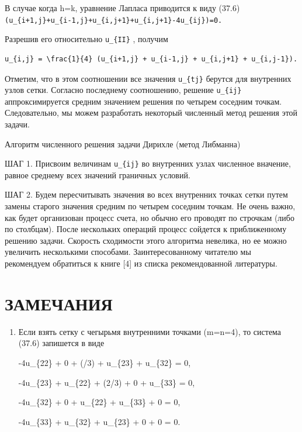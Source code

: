 \documentclass[
  ukrainian,
]{article}
\begin{document}
В случае когда h=k, уравнение Лапласа приводится к виду (37.6)
\texttt{(u\_\{i+1,j\}+u\_\{i-1,j\}+u\_\{i,j+1\}+u\_\{i,j+1\}-4u\_\{ij\})=0.}

Разрешив его относительно \texttt{u\_\{II\}} , получим

\begin{verbatim}
u_{i,j} = \frac{1}{4} (u_{i+1,j} + u_{i-1,j} + u_{i,j+1} + u_{i,j-1}).
\end{verbatim}

Отметим, что в этом соотношении все значения \texttt{u\_\{tj\}} берутся
для внутренних узлов сетки. Согласно последнему соотношению, решение
\texttt{u\_\{ij\}} аппроксимируется средним значением решения по четырем
соседним точкам. Следовательно, мы можем разработать некоторый численный
метод решения этой задачи.

Алгоритм численного решения задачи Дирихле (метод Либманна)

ШАГ 1. Присвоим величинам \texttt{u\_\{ij\}} во внутренних узлах
численное вначение, равное среднему всех значений граничных условий.

ШАГ 2. Будем пересчитывать значения во всех внутренних точках сетки
путем замены старого значения средним по четырем соседним точкам. Не
очень важно, как будет организован процесс счета, но обычно его проводят
по строчкам (либо по столбцам). После нескольких операций процесс
сойдется к приближенному решению задачи. Скорость сходимости этого
алгоритма невелика, но ее можно увеличить несколькими способами.
Заинтересованному читателю мы рекомендуем обратиться к книге {[}4{]} из
списка рекомендованной литературы.

\section{ЗАМЕЧАНИЯ}\label{ux437ux430ux43cux435ux447ux430ux43dux438ux44f-13}

\begin{enumerate}
\def\labelenumi{\arabic{enumi}.}
\item
  Если взять сетку с чегырьмя внутренними точками (m=n=4), то система
  (37.6) запишется в виде

  -4u\_\{22\} + 0 + \sin(\pi/3) + u\_\{23\} + u\_\{32\} = 0,

  -4u\_\{23\} + u\_\{22\} + \sin(2\pi/3) + 0 + u\_\{33\} = 0,

  -4u\_\{32\} + 0 + u\_\{22\} + u\_\{33\} + 0 = 0,

  -4u\_\{33\} + u\_\{32\} + u\_\{23\} + 0 + 0 = 0.
\end{enumerate}
\end{document}
